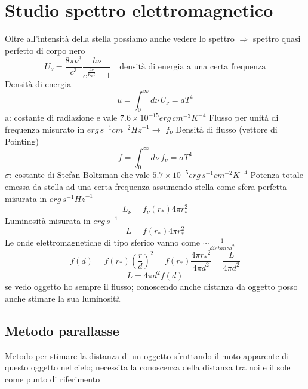 \section*{Studio spettro elettromagnetico}
Oltre all'intensità della stella possiamo anche vedere lo spettro $\Rightarrow$ spettro quasi perfetto di corpo nero
\begin{equation*}
    U_\nu = \frac{8\pi \nu^3 }{c^3} \frac{h\nu}{e^{\frac{h\nu}{K_B t}}-1} \quad \text{densità di energia a una certa frequenza}
\end{equation*}
Densità di energia
\begin{equation*}
    u = \int _0^\infty d\nu \, U_\nu = aT^4
\end{equation*}
a: costante di radiazione e vale $7.6 \times 10^{-15} erg \, cm^{-3}K^{-4}$ \newline
Flusso per unità di frequenza misurato in $erg \, s^{-1} cm^{-2}{Hz}^{-1} \rightarrow$ $f_\nu$\newline
Densità di flusso (vettore di Pointing)
\begin{equation*}
    f = \int_0^\infty d\nu \, f_\nu = \sigma T^4
\end{equation*}
$\sigma$: costante di Stefan-Boltzman che vale $5.7 \times 10^{-5} erg \, s^{-1} {cm}^{-2}K^{-4}$ \newline
Potenza totale emessa da stella ad una certa frequenza assumendo stella come sfera perfetta misurata in $erg \, s^{-1}{Hz}^{-1}$
\begin{equation*}
    L_\nu = f_\nu (r_*) 4\pi r_*^2
\end{equation*}
Luminosità misurata in $erg \, s^{-1}$
\begin{equation*}
    L = f(r_*)4\pi r_*^2
\end{equation*}
Le onde elettromagnetiche di tipo sferico vanno come $\sim \frac{1}{{distanza}^2}$ 
\begin{equation*}
    f(d) = f(r_*){\left(\frac{r}{d}\right)}^2 = f(r_*)\frac{4\pi {r_*}^2}{4\pi d^2} = \frac{L}{4\pi d^2}
\end{equation*}
\begin{equation}
    L = 4\pi d^2 f(d)
\end{equation}
se vedo oggetto ho sempre il flusso; conoscendo anche distanza da oggetto posso anche stimare la sua luminosità

\subsection*{Metodo parallasse}
Metodo per stimare la distanza di un oggetto sfruttando il moto apparente di questo oggetto nel cielo; necessita la conoscenza della distanza tra noi e il sole come punto di riferimento \newline

